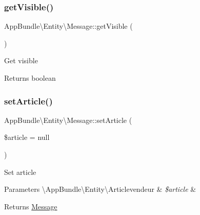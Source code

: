 \subsubsection{\texorpdfstring{get\+Visible()}{getVisible()}}
{\footnotesize\ttfamily App\+Bundle\textbackslash{}\+Entity\textbackslash{}\+Message\+::get\+Visible (\begin{DoxyParamCaption}{ }\end{DoxyParamCaption})}

Get visible

\begin{DoxyReturn}{Returns}
boolean 
\end{DoxyReturn}
\mbox{\label{class_app_bundle_1_1_entity_1_1_message_af110feafae364e649531a72a23d84bd1}} 
\subsubsection{\texorpdfstring{set\+Article()}{setArticle()}}
{\footnotesize\ttfamily App\+Bundle\textbackslash{}\+Entity\textbackslash{}\+Message\+::set\+Article (\begin{DoxyParamCaption}\item[{\textbackslash{}\hyperlink{class_app_bundle_1_1_entity_1_1_articlevendeur}{App\+Bundle\textbackslash{}\+Entity\textbackslash{}\+Articlevendeur}}]{\$article = {\ttfamily null} }\end{DoxyParamCaption})}

Set article


\begin{DoxyParams}[1]{Parameters}
\textbackslash{}\+App\+Bundle\textbackslash{}\+Entity\textbackslash{}\+Articlevendeur & {\em \$article} & \\
\hline
\end{DoxyParams}
\begin{DoxyReturn}{Returns}
\hyperlink{class_app_bundle_1_1_entity_1_1_message}{Message} 
\end{DoxyReturn}
\mbox{\label{class_app_bundle_1_1_entity_1_1_message_a29977689cfcc1540717e0a66503f0500}} 
